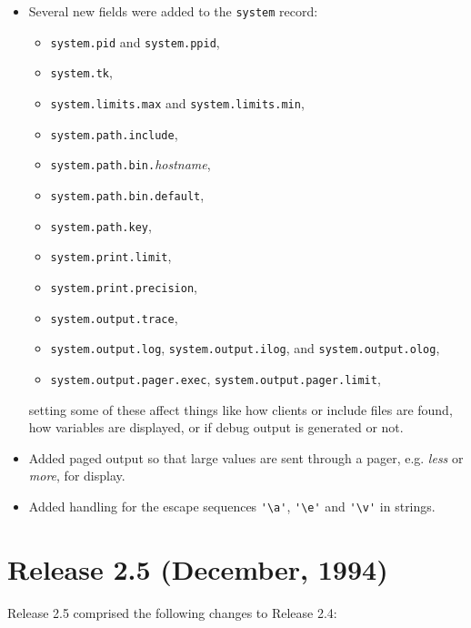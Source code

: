 \begin{itemize}
\item Several new fields were added to the \texttt{system} record:
\begin{itemize}
\item \verb+system.pid+ and \verb+system.ppid+, 
\item \verb+system.tk+, 
\item \verb+system.limits.max+ and \verb+system.limits.min+, 
\item \verb+system.path.include+, 
\item \verb+system.path.bin.+\emph{hostname}, 
\item \verb+system.path.bin.default+, 
\item \verb+system.path.key+, 
\item \verb+system.print.limit+, 
\item \verb+system.print.precision+, 
\item \verb+system.output.trace+, 
\item \verb+system.output.log+, \verb+system.output.ilog+, and \verb+system.output.olog+, 
\item \verb+system.output.pager.exec+, \verb+system.output.pager.limit+, 
\end{itemize}
setting some of these affect things like how clients or include files
are found, how variables are displayed, or if debug output is generated
or not.

\item Added paged output so that large values are sent through a pager, e.g.
\emph{less} or \emph{more}, for display.

\item Added handling for the escape sequences \verb+'\a'+, \verb+'\e'+ and \verb+'\v'+
in strings.

\end{itemize}


\section{Release 2.5 (December, 1994)}

Release 2.5 comprised the following changes to Release 2.4:

